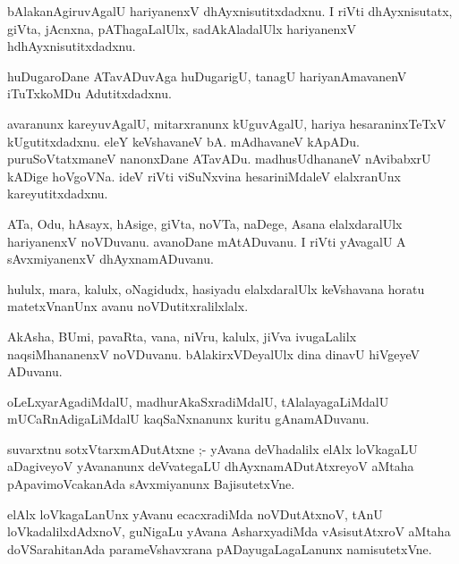 \documentclass{article}
\begin{document}
\begin{mn}
bAlakanAgiruvAgalU hariyanenxV dhAyxnisutitxdadxnu. I riVti dhAyxnisutatx, 
giVta, jAcnxna, pAThagaLalUlx, sadAkAladalUlx hariyanenxV hdhAyxnisutitxdadxnu.
\end{mn}

\begin{mn}
huDugaroDane ATavADuvAga  huDugarigU,  tanagU hariyanAmavanenV iTuTxkoMDu Adutitxdadxnu.
\end{mn}

\begin{mn}
avaranunx  kareyuvAgalU,  mitarxranunx  kUguvAgalU, hariya hesaraninxTeTxV  
kUgutitxdadxnu.  eleY keVshavaneV bA. mAdhavaneV kApADu.  puruSoVtatxmaneV  
nanonxDane ATavADu.  madhusUdhananeV nAvibabxrU  kADige  hoVgoVNa.  ideV 
riVti  viSuNxvina  hesariniMdaleV elalxranUnx kareyutitxdadxnu.
\end{mn}

\begin{mn}
ATa, Odu, hAsayx, hAsige, giVta, noVTa, naDege, Asana elalxdaralUlx  
hariyanenxV noVDuvanu.  avanoDane mAtADuvanu.  I riVti yAvagalU A 
sAvxmiyanenxV dhAyxnamADuvanu.
\end{mn}

\begin{mn}
hululx, mara, kalulx, oNagidudx, hasiyadu elalxdaralUlx keVshavana horatu 
matetxVnanUnx avanu noVDutitxralilxlalx.
\end{mn}

\begin{mn}
AkAsha, BUmi, pavaRta, vana, niVru, kalulx, jiVva ivugaLalilx naqsiMhananenxV 
noVDuvanu. bAlakirxVDeyalUlx dina dinavU hiVgeyeV ADuvanu.
\end{mn}

\begin{mn}
oLeLxyarAgadiMdalU, madhurAkaSxradiMdalU,  tAlalayagaLiMdalU mUCaRnAdigaLiMdalU  
kaqSaNxnanunx kuritu gAnamADuvanu.
\end{mn}

\begin{mn}
suvarxtnu sotxVtarxmADutAtxne ;- yAvana deVhadalilx elAlx loVkagaLU aDagiveyoV 
yAvananunx deVvategaLU dhAyxnamADutAtxreyoV aMtaha pApavimoVcakanAda sAvxmiyanunx BajisutetxVne.
\end{mn}

\begin{mn}
elAlx loVkagaLanUnx yAvanu  ecacxradiMda noVDutAtxnoV, tAnU loVkadalilxdAdxnoV, 
guNigaLu yAvana AsharxyadiMda vAsisutAtxroV aMtaha doVSarahitanAda 
parameVshavxrana pADayugaLagaLanunx namisutetxVne.
\end{mn}
\end{document}
